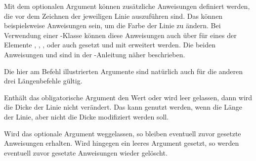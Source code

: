 Mit dem optionalen Argument
 können zusätzliche Anweisungen definiert werden, die vor
dem Zeichnen der jeweiligen Linie auszuführen sind.  Das können beispielsweise
Anweisungen sein, um die
Farbe der Linie zu ändern.  Bei Verwendung einer
\KOMAScript-Klasse können diese Anweisungen auch über
 für eines der Elemente
%
,
,
,
 oder
auch 
gesetzt und mit  erweitert
werden. Die beiden Anweisungen  und 
sind in der \KOMAScript-Anleitung näher beschrieben.


\begin{Declaration}
  \Parameter{}%
  \Parameter{}\OParameter{}
\end{Declaration}%
Die hier am Befehl  illustrierten Argumente
sind natürlich auch für die anderen drei Längenbefehle gültig.

Enthält das obligatorische Argument den Wert  oder wird
leer gelassen, dann wird die Dicke der Linie nicht verändert.  Das kann
genutzt werden, wenn die Länge der Linie, aber nicht die Dicke modifiziert
werden soll.

Wird das optionale Argument  weggelassen, so bleiben
eventuell zuvor gesetzte Anweisungen erhalten. Wird hingegen ein leeres
Argument  gesetzt, so werden eventuell zuvor gesetzte
Anweisungen wieder gelöscht.

